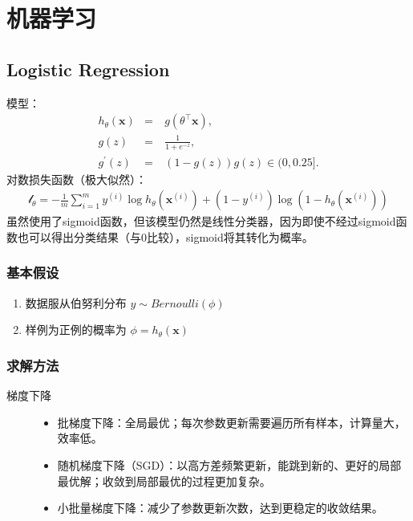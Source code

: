 \documentclass[letterpaper,10pt,english]{sphinxmanual}
\begin{document}
\chapter{机器学习}
\label{\detokenize{machineLearning/index::doc}}\label{\detokenize{machineLearning/index:id1}}

\section{Logistic Regression}
\label{\detokenize{machineLearning/01_lr:logistic-regression}}\label{\detokenize{machineLearning/01_lr::doc}}
模型：
\begin{equation*}
\begin{split}h_\theta(\mathbf{x}) & = & \  g(\theta^\top \mathbf{x}),\\
g(z) & = & \  \frac{1}{1+e^{-z}},\\
g^\prime(z) & = & \  (1-g(z))g(z) \in (0, 0.25].\end{split}
\end{equation*}
对数损失函数（极大似然）：
\begin{equation*}
\begin{split}\mathcal{l}_\theta = -\frac{1}{m} \sum_{i=1}^m y^{(i)} \log h_\theta(\mathbf{x}^{(i)}) + (1 - y^{(i)}) \log(1 - h_\theta(\mathbf{x}^{(i)}))\end{split}
\end{equation*}
虽然使用了sigmoid函数，但该模型仍然是线性分类器，因为即使不经过sigmoid函数也可以得出分类结果（与0比较），sigmoid将其转化为概率。


\subsection{基本假设}
\label{\detokenize{machineLearning/01_lr:id1}}\begin{enumerate}
\item {} 
数据服从伯努利分布 \(y \sim Bernoulli(\phi)\)

\item {} 
样例为正例的概率为 \(\phi=h_\theta(\mathbf{x})\)

\end{enumerate}


\subsection{求解方法}
\label{\detokenize{machineLearning/01_lr:id2}}\begin{description}
\item[{梯度下降}] \leavevmode\begin{itemize}
\item {} 
批梯度下降：全局最优；每次参数更新需要遍历所有样本，计算量大，效率低。

\item {} 
随机梯度下降（SGD）：以高方差频繁更新，能跳到新的、更好的局部最优解；收敛到局部最优的过程更加复杂。

\item {} 
小批量梯度下降：减少了参数更新次数，达到更稳定的收敛结果。

\end{itemize}

\end{description}
\end{document}
